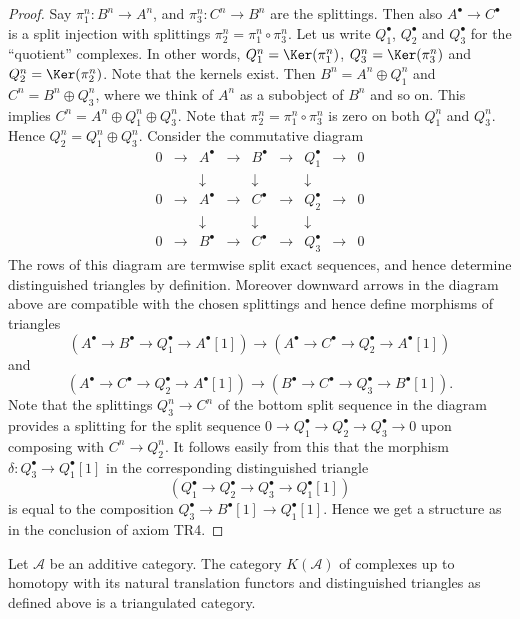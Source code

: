 \begin{proof}
Say $\pi_1^n : B^n \to A^n$, and $\pi_3^n : C^n \to B^n$ are the splittings.
Then also $A^\bullet \to C^\bullet$ is a split injection with splittings
$\pi_2^n = \pi_1^n \circ \pi_3^n$. Let us write $Q_1^\bullet$, $Q_2^\bullet$
and $Q_3^\bullet$ for the ``quotient'' complexes. In other words,
$Q_1^n = \Ker(\pi_1^n)$, $Q_3^n = \Ker(\pi_3^n)$ and
$Q_2^n = \Ker(\pi_2^n)$. Note that the kernels exist. Then
$B^n = A^n \oplus Q_1^n$ and $C^n = B^n \oplus Q_3^n$, where we think of $A^n$
as a subobject of $B^n$ and so on. This implies
$C^n = A^n \oplus Q_1^n \oplus Q_3^n$. Note that
$\pi_2^n = \pi_1^n \circ \pi_3^n$ is zero on both $Q_1^n$ and $Q_3^n$. Hence
$Q_2^n = Q_1^n \oplus Q_3^n$. Consider the commutative diagram
$$
\begin{matrix}
0 & \to & A^\bullet & \to & B^\bullet & \to & Q_1^\bullet & \to & 0 \\
  &     & \downarrow &     & \downarrow &     & \downarrow  & \\
0 & \to & A^\bullet & \to & C^\bullet & \to & Q_2^\bullet & \to & 0 \\
  &     & \downarrow &     & \downarrow &     & \downarrow  & \\
0 & \to & B^\bullet & \to & C^\bullet & \to & Q_3^\bullet & \to & 0
\end{matrix}
$$
The rows of this diagram are termwise split exact sequences, and
hence determine distinguished triangles by
definition. Moreover downward arrows in the diagram above
are compatible with the chosen splittings and hence
define morphisms of triangles
$$
(A^\bullet \to B^\bullet \to Q_1^\bullet \to A^\bullet[1])
\longrightarrow
(A^\bullet \to C^\bullet \to Q_2^\bullet \to A^\bullet[1])
$$
and
$$
(A^\bullet \to C^\bullet \to Q_2^\bullet \to A^\bullet[1])
\longrightarrow
(B^\bullet \to C^\bullet \to Q_3^\bullet \to B^\bullet[1]).
$$
Note that the splittings $Q_3^n \to C^n$
of the bottom split sequence in the diagram provides a splitting
for the split sequence
$0 \to Q_1^\bullet \to Q_2^\bullet \to Q_3^\bullet \to 0$
upon composing with $C^n \to Q_2^n$. It follows easily from this
that the morphism $\delta : Q_3^\bullet \to Q_1^\bullet[1]$
in the corresponding distinguished triangle
$$
(Q_1^\bullet \to Q_2^\bullet \to Q_3^\bullet \to Q_1^\bullet[1])
$$
is equal to the composition $Q_3^\bullet \to B^\bullet[1] \to Q_1^\bullet[1]$.
Hence we get a structure as in the conclusion of axiom TR4.
\end{proof}

\begin{proposition}
\label{proposition-homotopy-category-triangulated}
Let $\mathcal{A}$ be an additive category.
The category $K(\mathcal{A})$ of complexes up to
homotopy with its natural translation functors
and distinguished triangles as defined above
is a triangulated category.
\end{proposition}

